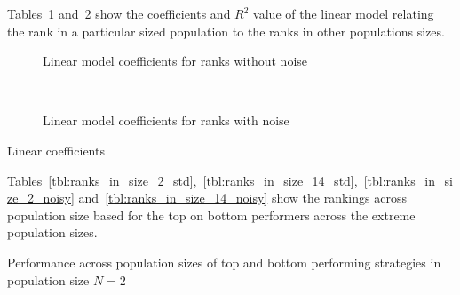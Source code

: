 \documentclass{article}
\begin{document}
Tables~\ref{tbl:linear_coeficients_std} and~\ref{tbl:linear_coeficients_noisy}
show the coefficients and \(R^2\) value of the linear model relating the rank in
a particular sized population to the ranks in other populations sizes.

\begin{table}[!hbtp]
    \begin{subfigure}{.5\textwidth}
        \centering
        
        \caption{Linear model coefficients for ranks without noise}
        \label{tbl:linear_coeficients_std}
    \end{subfigure}%
    ~
    \begin{subfigure}{.5\textwidth}
        \centering
        
        \caption{Linear model coefficients for ranks with noise}
        \label{tbl:linear_coeficients_noisy}
    \end{subfigure}
    \caption{Linear coefficients}
\end{table}

Tables~\ref{tbl:ranks_in_size_2_std},~\ref{tbl:ranks_in_size_14_std},~\ref{tbl:ranks_in_size_2_noisy}
and~\ref{tbl:ranks_in_size_14_noisy} show the rankings across population size
based for the top on bottom performers across the extreme population sizes.

\begin{table}[!hbtp]
    \centering
        \begin{subfigure}[t]{\textwidth}
            \centering
                
            \label{tbl:top_five_in_size_2_std}
        \end{subfigure}

        \begin{subfigure}[t]{\textwidth}
            \centering
                
            \label{tbl:bottom_five_in_size_2_std}
        \end{subfigure}%
        \caption{Performance across population sizes of top and bottom
        performing strategies in population size \(N=2\)}
        \label{tbl:ranks_in_size_2_std}
\end{table}
\end{document}
